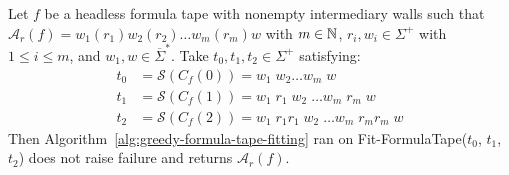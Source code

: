 

\begin{theorem}\label{th:greedy-formula-tape-fitting}
    Let $f$ be a headless formula tape with nonempty intermediary walls such that $\mathcal{A}_r(f) = w_1 (r_1) w_2 (r_2)\dots w_m (r_m) w$ with $m\in\mathbb{N}$, $r_i, w_i \in \Sigma^+$ with $1 \leq i \leq m$, and $w_1, w \in \overline{\Sigma}^*$. Take $t_0, t_1, t_2 \in \Sigma^+$ satisfying:
    \begin{align*}
        t_0 & = \mathcal{S}(C_f(0))  = w_1\; w_2 \dots w_m\; w                       \\
        t_1 & = \mathcal{S}(C_f(1))  = w_1\; r_1\; w_2\; \dots w_m\; r_m\; w         \\
        t_2 & = \mathcal{S}(C_f(2))  = w_1\; r_1 r_1\; w_2\; \dots w_m\; r_m r_m\; w
    \end{align*}
    Then Algorithm~\ref{alg:greedy-formula-tape-fitting} ran on {\sc Fit-FormulaTape}($t_0$, $t_1$, $t_2$) does not raise failure and returns $\mathcal{A}_r(f)$.

\end{theorem}
